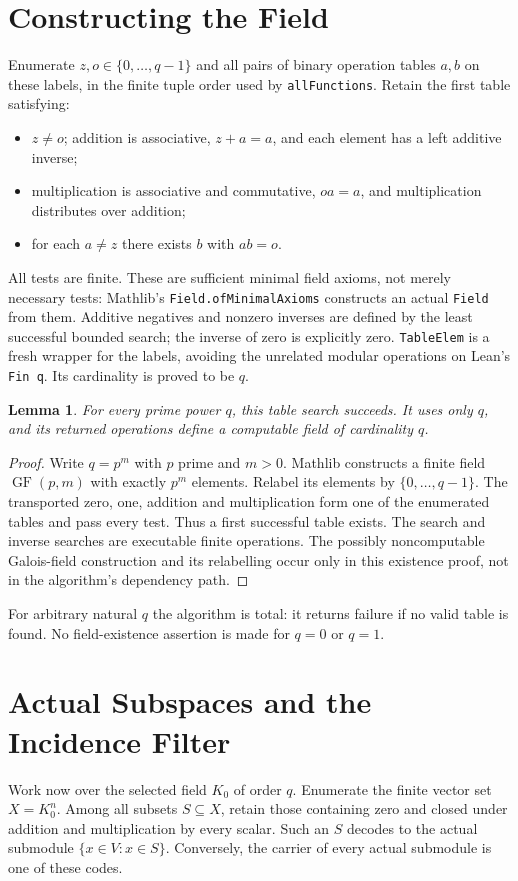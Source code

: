 \documentclass[11pt]{article}
\newtheorem{lemma}{Lemma}
\begin{document}
\section{Constructing the Field}
Enumerate $z,o\in\{0,\ldots,q-1\}$ and all pairs of binary operation
tables $a,b$ on these labels, in the finite tuple order used by
\texttt{allFunctions}. Retain the first table satisfying:
\begin{itemize}
\item $z\ne o$; addition is associative, $z+a=a$, and each element
has a left additive inverse;
\item multiplication is associative and commutative, $o a=a$, and
multiplication distributes over addition;
\item for each $a\ne z$ there exists $b$ with $ab=o$.
\end{itemize}
All tests are finite. These are sufficient minimal field axioms,
not merely necessary tests: Mathlib's \texttt{Field.ofMinimalAxioms}
constructs an actual \texttt{Field} from them. Additive negatives and
nonzero inverses are defined by the least successful bounded search;
the inverse of zero is explicitly zero. \texttt{TableElem} is a fresh
wrapper for the labels, avoiding the unrelated modular operations on
Lean's \texttt{Fin q}. Its cardinality is proved to be $q$.

\begin{lemma}\label{lem:field}
For every prime power $q$, this table search succeeds. It uses only $q$,
and its returned operations define a computable field of cardinality $q$.
\end{lemma}
\begin{proof}
Write $q=p^m$ with $p$ prime and $m>0$. Mathlib constructs a finite
field $\operatorname{GF}(p,m)$ with exactly $p^m$ elements. Relabel its
elements by $\{0,\ldots,q-1\}$. The transported zero, one, addition
and multiplication form one of the enumerated tables and pass every
test. Thus a first successful table exists. The search and inverse
searches are executable finite operations. The possibly noncomputable
Galois-field construction and its relabelling occur only in this
existence proof, not in the algorithm's dependency path.
\end{proof}
For arbitrary natural $q$ the algorithm is total: it returns failure
if no valid table is found. No field-existence assertion is made for
$q=0$ or $q=1$.

\section{Actual Subspaces and the Incidence Filter}
Work now over the selected field $K_0$ of order $q$. Enumerate the
finite vector set $X=K_0^n$. Among all subsets $S\subseteq X$, retain
those containing zero and closed under addition and multiplication
by every scalar. Such an $S$ decodes to the actual submodule
$\{x\in V:x\in S\}$. Conversely, the carrier of every actual
submodule is one of these codes.
\end{document}
